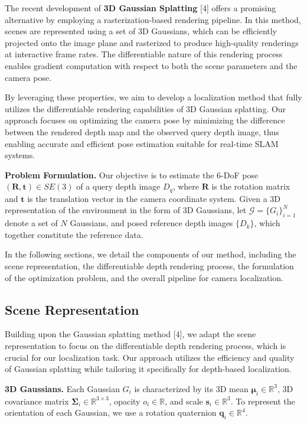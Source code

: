 \documentclass[twocolumn]{article} %
\begin{document}
The recent development of \textbf{3D Gaussian Splatting} {[}4{]} offers
a promising alternative by employing a rasterization-based rendering
pipeline. In this method, scenes are represented using a set of 3D
Gaussians, which can be efficiently projected onto the image plane and
rasterized to produce high-quality renderings at interactive frame
rates. The differentiable nature of this rendering process enables
gradient computation with respect to both the scene parameters and the
camera pose.

By leveraging these properties, we aim to develop a localization method
that fully utilizes the differentiable rendering capabilities of 3D
Gaussian splatting. Our approach focuses on optimizing the camera pose
by minimizing the difference between the rendered depth map and the
observed query depth image, thus enabling accurate and efficient pose
estimation suitable for real-time SLAM systems.

\textbf{Problem Formulation.} Our objective is to estimate the 6-DoF
pose \((\mathbf{R}, \mathbf{t}) \in SE(3)\) of a query depth image
\(D_q\), where \(\mathbf{R}\) is the rotation matrix and \(\mathbf{t}\)
is the translation vector in the camera coordinate system. Given a 3D
representation of the environment in the form of 3D Gaussians, let
\(\mathcal{G} = \{G_i\}_{i=1}^N\) denote a set of \(N\) Gaussians, and
posed reference depth images \(\{D_k\}\), which together constitute the
reference data.

In the following sections, we detail the components of our method,
including the scene representation, the differentiable depth rendering
process, the formulation of the optimization problem, and the overall
pipeline for camera localization.

\subsection{Scene Representation}\label{scene-representation}

Building upon the Gaussian splatting method {[}4{]}, we adapt the scene
representation to focus on the differentiable depth rendering process,
which is crucial for our localization task. Our approach utilizes the
efficiency and quality of Gaussian splatting while tailoring it
specifically for depth-based localization.

\textbf{3D Gaussians.} Each Gaussian \(G_i\) is characterized by its 3D
mean \(\boldsymbol{\mu}_i \in \mathbb{R}^3\), 3D covariance matrix
\(\boldsymbol{\Sigma}_i \in \mathbb{R}^{3\times3}\), opacity
\(o_i \in \mathbb{R}\), and scale \(\mathbf{s}_i \in \mathbb{R}^3\). To
represent the orientation of each Gaussian, we use a rotation quaternion
\(\mathbf{q}_i \in \mathbb{R}^4\).
\end{document}
